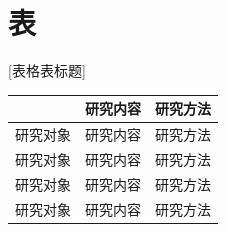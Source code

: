 \newpage
\section{表}

\begin{table}[!htbp]

	\centering
	[表格表标题]
	\label{tab:table-example}

	
	\begin{tabular*}{0.7\textwidth}{@{\extracolsep\fill}>{\hspace{0.5cm}}ccc<{\hspace{0.5cm}}}
		\toprule
					   &       研究内容        &     研究方法      \\
		\midrule
		研究对象  &       研究内容        &     研究方法      \\
		研究对象  &       研究内容        &     研究方法      \\
	 	研究对象  &       研究内容        &     研究方法      \\
		研究对象  &       研究内容        &     研究方法      \\
		\bottomrule
	\end{tabular*} 
	
\end{table}









